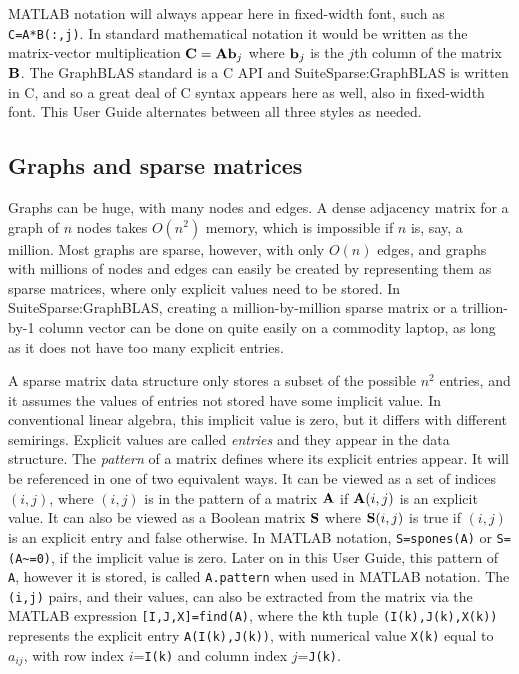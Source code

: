 \documentclass[12pt]{article}
\begin{document}
MATLAB notation will always appear here in fixed-width font, such as
\verb'C=A*B(:,j)'.  In standard mathematical notation it would be written as
the matrix-vector multiplication ${\bf C = A b}_j$ where ${\bf b}_j$ is the
$j$th column of the matrix ${\bf B}$.  The GraphBLAS standard is a C API and
SuiteSparse:GraphBLAS is written in C, and so a great deal of C syntax appears
here as well, also in fixed-width font.  This User Guide alternates between all
three styles as needed.

\subsection{Graphs and sparse matrices} %
\label{sparse}

Graphs can be huge, with many nodes and edges.  A dense adjacency matrix for a
graph of $n$ nodes takes $O(n^2)$ memory, which is impossible if $n$ is, say, a
million.  Most graphs are sparse, however, with only $O(n)$ edges, and graphs
with millions of nodes and edges can easily be created by representing them as
sparse matrices, where only explicit values need to be stored.  In
SuiteSparse:GraphBLAS, creating a million-by-million sparse matrix or a
trillion-by-1 column vector can be done on quite easily on a commodity laptop,
as long as it does not have too many explicit entries.

A sparse matrix data structure only stores a subset of the possible $n^2$
entries, and it assumes the values of entries not stored have some implicit
value.  In conventional linear algebra, this implicit value is zero, but it
differs with different semirings.  Explicit values are called {\em entries} and
they appear in the data structure.  The {\em pattern} of a matrix  defines
where its explicit entries appear.  It will be referenced in one of two
equivalent ways.  It can be viewed as a set of indices $(i,j)$, where $(i,j)$
is in the pattern of a matrix ${\bf A}$ if ${\bf A}(i,j)$ is an explicit value.
It can also be viewed as a Boolean matrix ${\bf S}$ where ${\bf S}(i,j)$ is
true if $(i,j)$ is an explicit entry and false otherwise.  In MATLAB notation,
\verb'S=spones(A)' or \verb'S=(A~=0)', if the implicit value is zero.  Later on
in this User Guide, this pattern of \verb'A', however it is stored, is called
\verb'A.pattern' when used in MATLAB notation.  The \verb'(i,j)' pairs, and
their values, can also be extracted from the matrix via the MATLAB expression
\verb'[I,J,X]=find(A)', where the \verb'k'th tuple \verb'(I(k),J(k),X(k))'
represents the explicit entry \verb'A(I(k),J(k))', with numerical value
\verb'X(k)' equal to $a_{ij}$, with row index $i$=\verb'I(k)' and column index
$j$=\verb'J(k)'.
\end{document}
